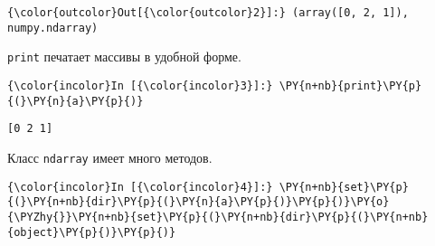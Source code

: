             \begin{Verbatim}[commandchars=\\\{\}]
{\color{outcolor}Out[{\color{outcolor}2}]:} (array([0, 2, 1]), numpy.ndarray)
\end{Verbatim}
        
    \texttt{print} печатает массивы в удобной форме.

    \begin{Verbatim}[commandchars=\\\{\}]
{\color{incolor}In [{\color{incolor}3}]:} \PY{n+nb}{print}\PY{p}{(}\PY{n}{a}\PY{p}{)}
\end{Verbatim}

    \begin{Verbatim}[commandchars=\\\{\}]
[0 2 1]

    \end{Verbatim}

    Класс \texttt{ndarray} имеет много методов.

    \begin{Verbatim}[commandchars=\\\{\}]
{\color{incolor}In [{\color{incolor}4}]:} \PY{n+nb}{set}\PY{p}{(}\PY{n+nb}{dir}\PY{p}{(}\PY{n}{a}\PY{p}{)}\PY{p}{)}\PY{o}{\PYZhy{}}\PY{n+nb}{set}\PY{p}{(}\PY{n+nb}{dir}\PY{p}{(}\PY{n+nb}{object}\PY{p}{)}\PY{p}{)}
\end{Verbatim}

